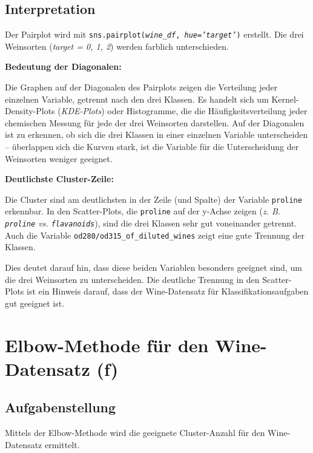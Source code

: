 \subsection{Interpretation}

Der Pairplot wird mit \texttt{sns.pairplot(\textit{wine\_df}, \textit{hue='target'})} erstellt. Die drei Weinsorten (\textit{target = 0, 1, 2}) werden farblich unterschieden.

\textbf{Bedeutung der Diagonalen:}

Die Graphen auf der Diagonalen des Pairplots zeigen die Verteilung jeder einzelnen Variable, getrennt nach den drei Klassen. Es handelt sich um Kernel-Density-Plots (\textit{\acs{KDE}-Plots}) oder Histogramme, die die Häufigkeitsverteilung jeder chemischen Messung für jede der drei Weinsorten darstellen. Auf der Diagonalen ist zu erkennen, ob sich die drei Klassen in einer einzelnen Variable unterscheiden – überlappen sich die Kurven stark, ist die Variable für die Unterscheidung der Weinsorten weniger geeignet.

\textbf{Deutlichste Cluster-Zeile:}

Die Cluster sind am deutlichsten in der Zeile (und Spalte) der Variable \texttt{proline} erkennbar. In den Scatter-Plots, die \texttt{proline} auf der y-Achse zeigen (\textit{\acs{z. B.} \texttt{proline} vs. \texttt{flavanoids}}), sind die drei Klassen sehr gut voneinander getrennt. Auch die Variable \texttt{od280/od315\_of\_diluted\_wines} zeigt eine gute Trennung der Klassen.

Dies deutet darauf hin, dass diese beiden Variablen besonders geeignet sind, um die drei Weinsorten zu unterscheiden. Die deutliche Trennung in den Scatter-Plots ist ein Hinweis darauf, dass der Wine-Datensatz für Klassifikationsaufgaben gut geeignet ist.

\cleardoublepage


\section{Elbow-Methode für den Wine-Datensatz (f)}
\label{sec:3f}

\subsection{Aufgabenstellung}

Mittels der Elbow-Methode wird die geeignete Cluster-Anzahl für den Wine-Datensatz ermittelt.

